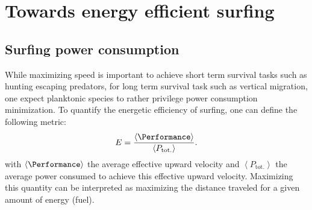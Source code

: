 \chapter{Towards energy efficient surfing}

\section{Surfing power consumption}

While maximizing speed is important to achieve short term survival tasks such as hunting escaping predators, for long term survival task such as vertical migration, one expect planktonic species to rather privilege power consumption minimization.
To quantify the energetic efficiency of surfing, one can define the following metric:
\begin{equation}
	E = \frac{\left\langle \Performance \right\rangle}{\left\langle P_{\mathrm{tot.}} \right\rangle}.
\end{equation}
with $\left\langle \Performance \right\rangle$ the average effective upward velocity and $\left\langle P_{\mathrm{tot.}} \right\rangle$ the average power consumed to achieve this effective upward velocity.
Maximizing this quantity can be interpreted as maximizing the distance traveled for a given amount of energy (fuel).

